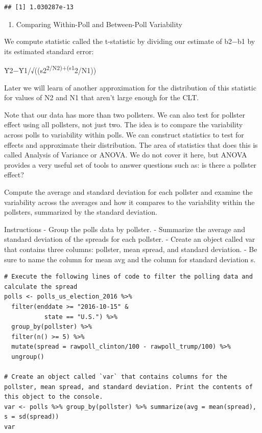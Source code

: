 \documentclass[
]{article}
\providecommand{\tightlist}{%
  \setlength{\itemsep}{0pt}\setlength{\parskip}{0pt}}
\begin{document}
\begin{verbatim}
## [1] 1.030287e-13
\end{verbatim}

\begin{enumerate}
\def\labelenumi{\arabic{enumi}.}
\setcounter{enumi}{16}
\tightlist
\item
  Comparing Within-Poll and Between-Poll Variability
\end{enumerate}

We compute statistic called the t-statistic by dividing our estimate of
b2−b1 by its estimated standard error:

Ȳ2−Ȳ1/√((s2\textsuperscript{2/N2)+(s1}2/N1))

Later we will learn of another approximation for the distribution of
this statistic for values of N2 and N1 that aren't large enough for the
CLT.

Note that our data has more than two pollsters. We can also test for
pollster effect using all pollsters, not just two. The idea is to
compare the variability across polls to variability within polls. We can
construct statistics to test for effects and approximate their
distribution. The area of statistics that does this is called Analysis
of Variance or ANOVA. We do not cover it here, but ANOVA provides a very
useful set of tools to answer questions such as: is there a pollster
effect?

Compute the average and standard deviation for each pollster and examine
the variability across the averages and how it compares to the
variability within the pollsters, summarized by the standard deviation.

Instructions - Group the polls data by pollster. - Summarize the average
and standard deviation of the spreads for each pollster. - Create an
object called var that contains three columns: pollster, mean spread,
and standard deviation. - Be sure to name the column for mean avg and
the column for standard deviation s.

\begin{verbatim}
# Execute the following lines of code to filter the polling data and calculate the spread
polls <- polls_us_election_2016 %>% 
  filter(enddate >= "2016-10-15" &
           state == "U.S.") %>%
  group_by(pollster) %>%
  filter(n() >= 5) %>% 
  mutate(spread = rawpoll_clinton/100 - rawpoll_trump/100) %>%
  ungroup()

# Create an object called `var` that contains columns for the pollster, mean spread, and standard deviation. Print the contents of this object to the console.
var <- polls %>% group_by(pollster) %>% summarize(avg = mean(spread), s = sd(spread))
var
\end{verbatim}
\end{document}
